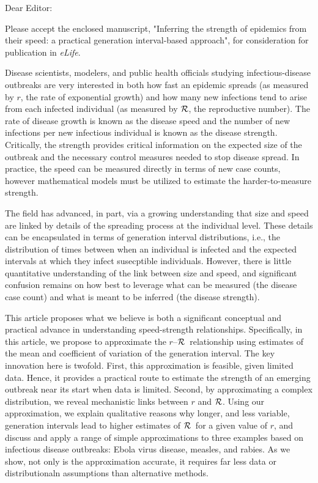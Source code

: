 \documentclass[10pt]{letter}
\newcommand{\rR}{\mbox{$r$--$\cal R$}}
\newcommand{\RR}{\ensuremath{{\cal R}}}
\begin{document}
\date{\today}

\signature{Sang Woo Park, David Champredon, Joshua S. Weitz, and Jonathan Dushoff (corresponding author)}

\begin{letter}{
}

\opening{Dear Editor:}

Please accept the enclosed manuscript, "Inferring the strength of epidemics from their speed: a practical generation interval-based approach", for consideration for publication in \emph{eLife}.

Disease scientists, modelers, and public health officials studying infectious-disease outbreaks are very interested in both how fast an epidemic spreads (as measured by $r$, the rate of exponential growth) and how many new infections tend to arise from each infected individual (as measured by \RR, the reproductive number). The rate of disease growth is known as the disease speed and the number of new infections per new infectious individual is known as the disease strength.  Critically, the strength provides critical information on the expected size of the outbreak and the necessary control measures needed to stop disease spread.  In practice, the speed can be measured directly in terms of new case counts, however mathematical models must be utilized to estimate the harder-to-measure strength.

The field has advanced, in part, via  a growing understanding that size and speed are linked by details of the spreading process at the individual level. These details can be encapsulated in terms of generation interval distributions, i.e., the distribution of times between when an individual is infected and the expected intervals at which they infect susecptible individuals.  However, there is little quantitative understanding of the link between size and speed, and significant confusion remains on how best to leverage what can be measured (the disease case count) and what is meant to be inferred (the disease strength). 

This article proposes what we believe is both a significant conceptual and practical advance in understanding speed-strength relationships. Specifically, in this article, we propose to approximate the \rR\ relationship using estimates of the mean and coefficient of variation of the generation interval. The key innovation here is twofold. First, this approximation is feasible, given limited data. Hence, it provides a practical route to estimate the strength of an emerging outbreak near its start when data is limited. Second, by approximating a complex distribution, we reveal mechanistic links between $r$ and \RR. Using our approximation, we explain qualitative reasons why longer, and less variable, generation intervals lead to higher estimates of \RR\ for a given value of $r$, and discuss and apply a range of simple approximations to three examples based on infectious disease outbreaks: Ebola virus disease, measles, and rabies. As we show, not only is the approximation accurate, it requires far less data or distributionaln assumptions than alternative methods.


\end{letter}
\end{document}
